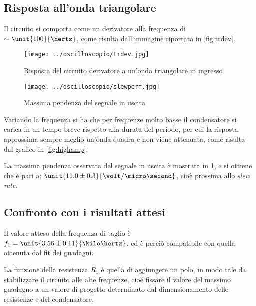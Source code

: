 \documentclass[10pt,a4paper]{article}
\begin{document}
\subsection{Risposta all'onda triangolare}
Il circuito si comporta come un derivatore alla frequenza di $\sim \unit{100}{\hertz}$, come risulta dall'immagine riportata in \figurename{\ref{fig:trdev}}.

\begin{figure}[H]
\centering
	\begin{minipage}[c]{0.49\textwidth}
		\centering
		\texttt{[image: ../oscilloscopio/trdev.jpg]}
		\caption{Risposta del circuito derivatore a un'onda triangolare in ingresso}
		\label{fig:trdev}
	\end{minipage}
	\begin{minipage}[c]{0.49\textwidth}
		\centering
		\texttt{[image: ../oscilloscopio/slewperf.jpg]}
		\caption{Massima pendenza del segnale in uscita}
		\label{fig:slewperf}
	\end{minipage}
\end{figure}

Variando la frequenza si ha che per frequenze molto basse il condensatore si carica in un tempo breve rispetto alla durata del periodo, per cui la risposta approssima sempre meglio un'onda quadra e non viene attenuata, come risulta dal grafico in \figurename{\ref{fig:highamp}}.

La massima pendenza osservata del segnale in uscita è mostrata in \figurename{\ref{fig:slewperf}}, e si ottiene che è pari a: $\unit{11.0 \pm 0.3}{\volt/\micro\second}$, cioè prossima allo \emph{slew rate}.


\subsection{Confronto con i risultati attesi}

Il valore atteso della frequenza di taglio è $f_1 = \unit{3.56 \pm 0.11}{\kilo\hertz}$, ed è perciò compatibile con quella ottenuta dal fit dei guadagni.


La funzione della resistenza $R_1$ è quella di aggiungere un polo, in modo tale da stabilizzare il circuito alle alte frequenze, cioé fissare il valore del massimo guadagno a un valore di progetto determinato dal dimensionamento delle resistenze e del condensatore.
\end{document}
